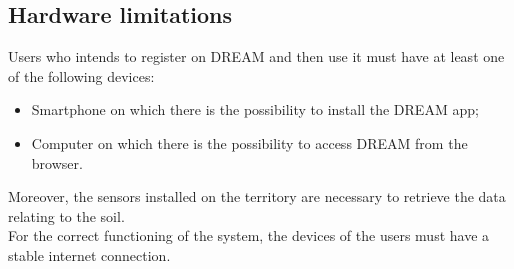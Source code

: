\subsection{Hardware limitations}

Users who intends to register on DREAM and then use it must have at least one of the following devices:
\begin{itemize}
    \item Smartphone on which there is the possibility to install the DREAM app;
    \item Computer on which there is the possibility to access DREAM from the browser.
\end{itemize}

Moreover, the sensors installed on the territory are necessary to retrieve the data relating to the soil.\\

For the correct functioning of the system, the devices of the users must have a stable internet connection.